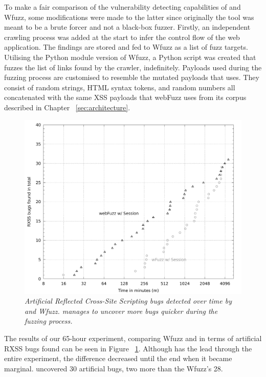 To make a fair comparison of the vulnerability detecting capabilities of \pname{} and Wfuzz, some modifications were made to the latter since originally the tool was meant to be a brute forcer and not a black-box fuzzer. Firstly, an independent crawling process was added at the start to infer the control flow of the web application. The findings are stored and fed to Wfuzz as a list of fuzz targets. Utilising the Python module version of Wfuzz, a Python script was created that fuzzes the list of links found by the crawler, indefinitely. Payloads used during the fuzzing process are customised to resemble the mutated payloads that \pname{} uses. They consist of random strings, HTML syntax tokens, and random numbers all concatenated with the same XSS payloads that webFuzz uses from its corpus described in Chapter ~\ref{sec:architecture}.

\begin{figure}[!htb]
  \centering \includegraphics[width=\linewidth]{figures/plot_bugs.pdf}
  \captionsetup{justification=centering}
  \caption[Number of artificial XSS bugs uncovered by \pname{} and Wfuzz]{\textit{Artificial Reflected Cross-Site Scripting bugs detected over time by \pname{} and Wfuzz. \pname{} manages to uncover more bugs quicker during the fuzzing process.}} 
  \label{fig:plot_rxss}
\end{figure}

The results of our 65-hour experiment, comparing Wfuzz and \pname{} in terms of artificial RXSS bugs found can be seen in Figure ~\ref{fig:plot_rxss}. Although \pname{} has the lead through the entire experiment, the difference decreased until the end when it became marginal. \pname{} uncovered 30 artificial bugs, two more than the Wfuzz's 28.

